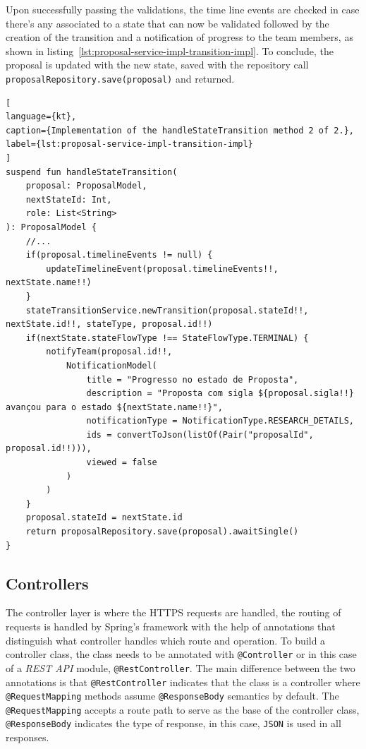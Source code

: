 Upon successfully passing the validations, the time line events are checked in case there's any associated to a state that can now be validated followed by the creation of the transition and a notification of progress to the team members, as shown in listing~\ref{lst:proposal-service-impl-transition-impl}. To conclude, the proposal is updated with the new state, saved with the repository call \lstinline{proposalRepository.save(proposal)} and returned.


\begin{lstlisting}[
language={kt},
caption={Implementation of the handleStateTransition method 2 of 2.},
label={lst:proposal-service-impl-transition-impl}
]
suspend fun handleStateTransition(
    proposal: ProposalModel,
    nextStateId: Int,
    role: List<String>
): ProposalModel {
    //...
    if(proposal.timelineEvents != null) {
        updateTimelineEvent(proposal.timelineEvents!!, nextState.name!!)
    }
    stateTransitionService.newTransition(proposal.stateId!!, nextState.id!!, stateType, proposal.id!!)
    if(nextState.stateFlowType !== StateFlowType.TERMINAL) {
        notifyTeam(proposal.id!!,
            NotificationModel(
                title = "Progresso no estado de Proposta",
                description = "Proposta com sigla ${proposal.sigla!!} avançou para o estado ${nextState.name!!}",
                notificationType = NotificationType.RESEARCH_DETAILS,
                ids = convertToJson(listOf(Pair("proposalId", proposal.id!!))),
                viewed = false
            )
        )
    }
    proposal.stateId = nextState.id
    return proposalRepository.save(proposal).awaitSingle()
}
\end{lstlisting}


\subsection{Controllers}\label{ch:impl:sec:be:subsec:controllers}

The controller layer is where the HTTPS requests are handled, the routing of requests is handled by Spring's framework with the help of annotations that distinguish what controller handles which route and operation.
To build a controller class, the class needs to be annotated with \lstinline{@Controller} or in this case of a \textit{REST API} module, \lstinline{@RestController}. The main difference between the two annotations is that \lstinline{@RestController} indicates that the class is a controller where \lstinline{@RequestMapping} methods assume \lstinline{@ResponseBody} semantics by default.
The \lstinline{@RequestMapping} accepts a route path to serve as the base of the controller class, \lstinline{@ResponseBody} indicates the type of response, in this case, \lstinline{JSON} is used in all responses. 

